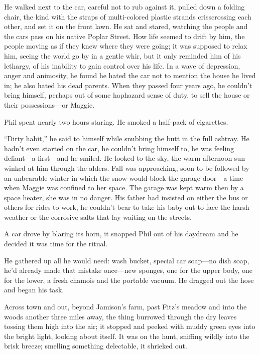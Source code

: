He walked next to the car, careful not to rub against it, pulled down a
folding chair, the kind with the straps of multi-colored plastic strands
crisscrossing each other, and set it on the front lawn. He sat and
stared, watching the people and the cars pass on his native Poplar
Street. How life seemed to drift by him, the people moving as if they
knew where they were going; it was supposed to relax him, seeing the
world go by in a gentle whir, but it only reminded him of his lethargy,
of his inability to gain control over his life. In a wave of depression,
anger and animosity, he found he hated the car not to mention the house
he lived in; he also hated his dead parents. When they passed four years
ago, he couldn't bring himself, perhaps out of some haphazard sense of
duty, to sell the house or their possessions---or Maggie.

Phil spent nearly two hours staring. He smoked a half-pack of
cigarettes.

``Dirty habit,'' he said to himself while snubbing the butt in the full
ashtray. He hadn't even started on the car, he couldn't bring himself
to, he was feeling defiant---a first---and he smiled. He looked to the
sky, the warm afternoon sun winked at him through the alders. Fall was
approaching, soon to be followed by an unbearable winter in which the
snow would block the garage door---a time when Maggie was confined to
her space. The garage was kept warm then by a space heater, she was in
no danger. His father had insisted on either the bus or others for rides
to work, he couldn't bear to take his baby out to face the harsh weather
or the corrosive salts that lay waiting on the streets.

A car drove by blaring its horn, it snapped Phil out of his daydream and
he decided it was time for the ritual.

He gathered up all he would need: wash bucket, special car soap---no
dish soap, he'd already made that mistake once---new sponges, one for
the upper body, one for the lower, a fresh chamois and the portable
vacuum. He dragged out the hose and began his task.

Across town and out, beyond Jamison's farm, past Fitz's meadow and into
the woods another three miles away, the thing burrowed through the dry
leaves tossing them high into the air; it stopped and peeked with muddy
green eyes into the bright light, looking about itself. It was on the
hunt, sniffing wildly into the brisk breeze; smelling something
delectable, it shrieked out.

